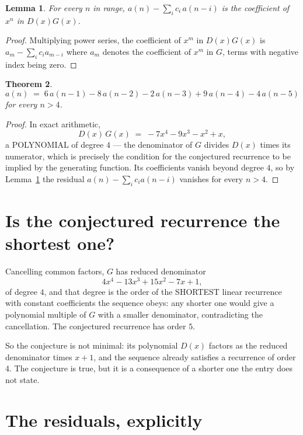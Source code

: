 \documentclass[11pt,a4paper]{article}
\theoremstyle{plain}
\newtheorem{theorem}{Theorem}
\newtheorem{lemma}[theorem]{Lemma}
\theoremstyle{definition}
\begin{document}
\begin{lemma}\label{lem:key}
For every $n$ in range, $a(n)-\sum_i c_i\,a(n-i)$ is the coefficient of $x^{n}$ in
$D(x)G(x)$.
\end{lemma}

\begin{proof}
Multiplying power series, the coefficient of $x^{m}$ in $D(x)G(x)$ is
$a_m-\sum_i c_i a_{m-i}$ where $a_m$ denotes the coefficient of $x^{m}$ in $G$, terms with
negative index being zero.
\end{proof}

\begin{theorem}
\[
a(n)\;=\;6\,a(n-1) - 8\,a(n-2) - 2\,a(n-3) + 9\,a(n-4) - 4\,a(n-5)
\]
for every $n>4$.
\end{theorem}

\begin{proof}
In exact arithmetic,
\[
D(x)\,G(x)\;=\;- 7 x^{4} - 9 x^{3} - x^{2} + x,
\]
a POLYNOMIAL of degree $4$ --- the denominator of $G$ divides $D(x)$ times its numerator,
which is precisely the condition for the conjectured recurrence to be implied by the
generating function. Its coefficients vanish beyond degree $4$, so by
Lemma~\ref{lem:key} the residual $a(n)-\sum_ic_ia(n-i)$ vanishes for every
$n>4$.
\end{proof}

\section{Is the conjectured recurrence the shortest one?}

Cancelling common factors, $G$ has reduced denominator
\[
4 x^{4} - 13 x^{3} + 15 x^{2} - 7 x + 1,
\]
of degree $4$, and that degree is the order of the SHORTEST linear recurrence with
constant coefficients the sequence obeys: any shorter one would give a polynomial multiple of
$G$ with a smaller denominator, contradicting the cancellation. The conjectured recurrence has
order $5$.

So the conjecture is not minimal: its polynomial $D(x)$ factors as the reduced denominator times $x + 1$, and the sequence already satisfies a recurrence of order 4. The conjecture is true, but it is a consequence of a shorter one the entry does not state.

\section{The residuals, explicitly}
\end{document}
